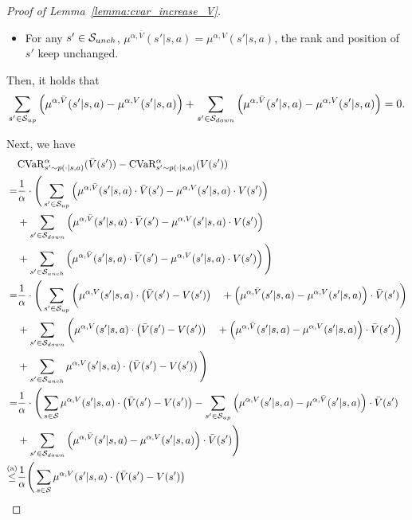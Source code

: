 \begin{proof}[Proof of Lemma~\ref{lemma:cvar_increase_V}]
\begin{itemize}
		\item For any $s' \in \mathcal{S}_{unch}$,  $\mu^{\alpha,\bar{V}}(s'|s,a) = \mu^{\alpha,V}(s'|s,a)$, the rank and position of $s'$ keep unchanged. 
	\end{itemize}
	
	Then, it holds that
	\begin{align}
		\sum_{s' \in \mathcal{S}_{up}}  \left( \mu^{\alpha,\bar{V}}(s'|s,a) - \mu^{\alpha,V}(s'|s,a) \right)  + \sum_{s' \in \mathcal{S}_{down}}  \left( \mu^{\alpha,\bar{V}}(s'|s,a) - \mu^{\alpha,V}(s'|s,a) \right) =0 . \label{eq:V_shift_asc_des}
	\end{align}
	
	Next, we have
	\begin{align*}
		& \cvar^{\alpha}_{s' \sim p(\cdot|s,a)}(\bar{V}(s')) - \cvar^{\alpha}_{s' \sim p(\cdot|s,a)}(V(s')) 
		\\
		= & \frac{1}{\alpha} \cdot \Bigg( \sum_{s' \in \cS_{up}} \sbr{ \mu^{\alpha,\bar{V}}(s'|s,a) \cdot \bar{V}(s') - \mu^{\alpha,V}(s'|s,a) \cdot V(s') } 
		\\& 
		+ \sum_{s' \in \cS_{down}} \sbr{ \mu^{\alpha,\bar{V}}(s'|s,a) \cdot \bar{V}(s') - \mu^{\alpha,V}(s'|s,a) \cdot V(s') } 
		\\& 
		+ \sum_{s' \in \cS_{unch}} \sbr{ \mu^{\alpha,\bar{V}}(s'|s,a) \cdot \bar{V}(s') - \mu^{\alpha,V}(s'|s,a) \cdot V(s') } \Bigg)
		\\
		= & \frac{1}{\alpha} \cdot \Bigg( \sum_{s' \in \cS_{up}} \bigg( \mu^{\alpha,V}(s'|s,a) \cdot \sbr{ \bar{V}(s') -  V(s') } 
		\quad + \sbr{ \mu^{\alpha,\bar{V}}(s'|s,a) - \mu^{\alpha,V}(s'|s,a) } \cdot \bar{V}(s') \bigg)
		\\& 
		+ \sum_{s' \in \cS_{down}} \bigg( \mu^{\alpha,V}(s'|s,a) \cdot \sbr{ \bar{V}(s') -  V(s') } 
		\quad + \sbr{ \mu^{\alpha,\bar{V}}(s'|s,a) - \mu^{\alpha,V}(s'|s,a) } \cdot \bar{V}(s') \bigg)
		\\& + \sum_{s' \in \cS_{unch}} \mu^{\alpha,V}(s'|s,a) \cdot \sbr{  \bar{V}(s') -  V(s') } \Bigg)
		\\
		= & \frac{1}{\alpha} \cdot \Bigg( \sum_{s \in \cS} \mu^{\alpha,V}(s'|s,a) \cdot \sbr{ \bar{V}(s') - V(s') }
		- \sum_{s' \in \cS_{up}}  \sbr{\mu^{\alpha,V}(s'|s,a) - \mu^{\alpha,\bar{V}}(s'|s,a) } \cdot \bar{V}(s') 
		\\ 
		& + \sum_{s' \in \cS_{down}}  
		\sbr{ \mu^{\alpha,\bar{V}}(s'|s,a) - \mu^{\alpha,V}(s'|s,a) } \cdot \bar{V}(s') 
		\Bigg)
		\\
		\overset{\textup{(a)}}{\leq} & \frac{1}{\alpha} \Bigg( \sum_{s \in \cS}  \mu^{\alpha,V}(s'|s,a) \cdot \sbr{ \bar{V}(s') - V(s') }

\end{align*}
\end{proof}
